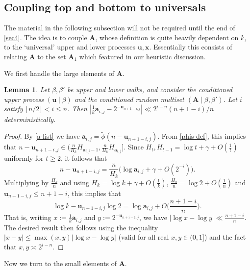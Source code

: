 \documentclass[11pt,reqno]{amsart}
\numberwithin{equation}{section}
\newtheorem{lemma}[theorem]{Lemma}
\theoremstyle{definition}
\theoremstyle{remark}
\newcommand{\mbf}{\mathbf}
\renewcommand{\le}{\leqslant}
\renewcommand{\ge}{\geqslant}
\begin{document}
\subsection{Coupling top and bottom to universals} 

The material in the following subsection will not be required until the end of \cref{sec4}. The idea is to couple $\mbf{A}$, whose definition is quite heavily dependent on $k$, to the `universal' upper and lower processes $\mbf{u}, \mbf{x}$. Essentially this consists of relating $\mbf{A}$ to the set $\mbf{A}_1$ which featured in our heuristic discussion. 

We first handle the large elements of $\mbf{A}$.

\begin{lemma}\label{u-couple}
Let $\beta, \beta'$ be upper and lower walks, and consider the conditioned upper process $(\mbf{u} \mid \beta)$ and the conditioned random multiset $(\mbf{A} \mid \beta,\beta')$. Let $i$ satisfy $\lfloor n/2\rfloor < i \le n$. Then $|\frac{1}{k} \mbf{a}_{i,j} - 2^{-\mbf{u}_{n + 1-i,j}} | \ll 2^{i - n} (n + 1 - i)/n$ deterministically.
\end{lemma}
\begin{proof}  By \cref{a-list} we have $\mbf{a}_{i,j}  = \tilde\phi( n - \mbf{u}_{n + 1 -i,j})$. From \cref{phis-def}, this implies that $n - \mbf{u}_{n + 1 - i,j} \in (\frac{n}{H_k} H_{\mbf{a}_{i,j} - 1}, \frac{n}{H_k}H_{\mbf{a}_{i,j}}]$.
Since $H_t, H_{t-1} = \log t + \gamma + O(\frac{1}{t})$ uniformly for $t \ge 2$, it follows that
\[ n - \mbf{u}_{n + 1 -i,j} = \frac{n}{H_k}\big(\log \mbf{a}_{i,j} + \gamma + O(2^{-i})\big).\] Multiplying by $\frac{H_k}{n}$ and using $H_k = \log k + \gamma + O(\frac{1}{k})$, $\frac{H_k}{n} = \log 2 + O(\frac{1}{n})$ and $\mbf{u}_{n + 1 - i,j} \le n + 1 -i$, this implies that
\[ \log k - \mbf{u}_{n + 1 -i,j} \log 2 = \log \mbf{a}_{i,j} + O\big(\frac{n + 1 -i}{n}\big).\] That is, writing $x := \frac{1}{k} \mbf{a}_{i,j}$ and $y := 2^{-\mbf{u}_{n + i - 1,j}}$, we have $|\log x - \log y| \ll \frac{n + 1 - i}{n}$. The desired result then follows using the inequality $|x - y| \le \max(x,y) |\log x - \log y|$ (valid for all real $x,y \in (0,1]$) and the fact that $x,y \asymp 2^{i - n}$.
\end{proof}

Now we turn to the small elements of $\mbf{A}$.
\end{document}
